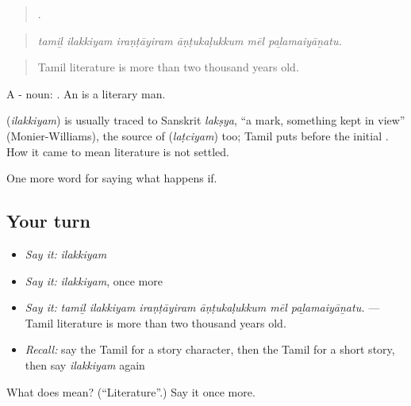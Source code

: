 \begin{quote}
     .
\end{quote}

\begin{quote}
\emph{tamiḻ ilakkiyam iraṇṭāyiram āṇṭukaḷukkum mēl paḻamaiyāṉatu.}
\end{quote}

\begin{quote}
Tamil literature is more than two thousand years old.
\end{quote}

A - noun: . An  is a literary man.

\begin{cousinweb}
\textbf{} (\emph{ilakkiyam}) is usually traced to Sanskrit \emph{lakṣya}, \textquotedblleft{}a mark, something kept in view\textquotedblright{} (Monier-Williams), the source of  (\emph{laṭciyam}) too; Tamil puts  before the initial . How it came to mean literature is not settled.
\end{cousinweb}

\begin{grammarlens}[title={What you've built}]
One more word for saying what happens if.
\end{grammarlens}

\subsection*{Your turn}
\begin{itemize}
\raggedright
  \item \emph{Say it:} \emph{ilakkiyam}
  \item \emph{Say it:} \emph{ilakkiyam}, once more
  \item \emph{Say it:} \emph{tamiḻ ilakkiyam iraṇṭāyiram āṇṭukaḷukkum mēl paḻamaiyāṉatu.} — Tamil literature is more than two thousand years old.
  \item \emph{Recall:} say the Tamil for a story character, then the Tamil for a short story, then say \emph{ilakkiyam} again
\end{itemize}

\begin{tcolorbox}[breakable,colback=teal!4,colframe=teal!35!black,title={Before you move on}]
What does  mean? (\textquotedblleft{}Literature\textquotedblright{}.) Say it once more.
\end{tcolorbox}
